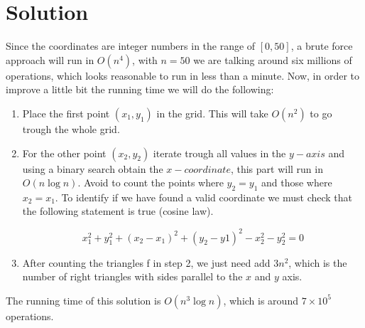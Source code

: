 \section*{Solution}

Since the coordinates are integer numbers in the range of $[0,50]$, a brute force approach will run in $O(n^4)$, with $n=50$ we are talking around six millions of operations, which looks reasonable to run in less than a minute. Now, in order to improve a little bit the running time we will do the following:

\begin{enumerate}
    \item Place the first point $(x_1,y_1)$ in the grid. This will take $O(n^2)$ to go trough the whole grid.
    \item For the other point $(x_2,y_2)$ iterate trough all values in the $y-axis$ and using a binary search obtain the $x-coordinate$, this part will run in $O(n \log n)$. Avoid to count the points where $y_2 = y_1$ and those where $x_2 = x_1$. To identify if we have found a valid coordinate we must check that the following statement is true (cosine law).
    
    $$
    x_1^2 + y_1^2 + (x_2-x_1)^2 + (y_2-y1)^2 - x_2^2 - y_2^2 = 0
    $$
    
    \item After counting the triangles f in step 2, we just need add $3n^2$, which is the number of right triangles with sides parallel to the $x$ and $y$ axis. 
    
\end{enumerate}

The running time of this solution is $O(n^3 \log n)$, which is around $7 \times 10^5$ operations.